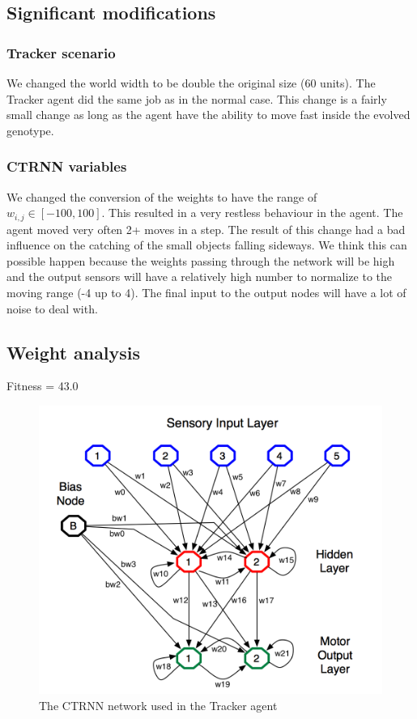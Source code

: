 \subsection{Significant modifications}
\subsubsection{Tracker scenario}
We changed the world width to be double the original size (60 units). The Tracker agent did the same job as in the normal case. This change is a fairly small change as long as the agent have the ability to move fast inside the evolved genotype. 

\subsubsection{CTRNN variables}
We changed the conversion of the weights to have the range of $w_{i,j} \in [-100, 100]$. This resulted in a very restless behaviour in the agent. The agent moved very often 2+ moves in a step. The result of this change had a bad influence on the catching of the small objects falling sideways. We think this can possible happen because the weights passing through the network will be high and the output sensors will have a relatively high number to normalize to the moving range (-4 up to 4). The final input to the output nodes will have a lot of noise to deal with. 


\subsection{Weight analysis}


Fitness = 43.0
\begin{figure}[h]
  \centering
    \includegraphics[width=1.0\textwidth]{img/CTRNN}
    \caption{The CTRNN network used in the Tracker agent}
\end{figure}

